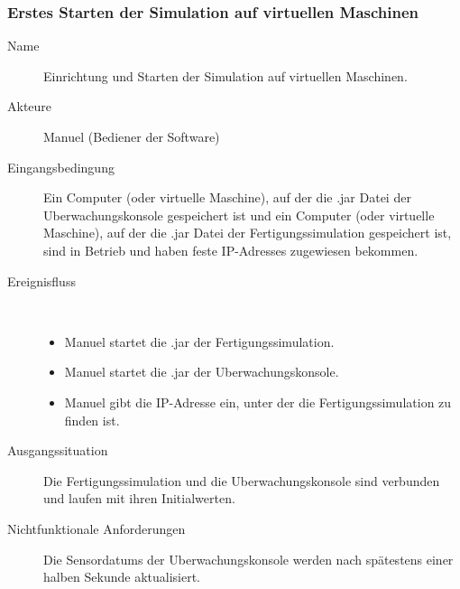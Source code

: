 \documentclass[parskip=full]{scrartcl}
\begin{document}
\subsubsection{Erstes Starten der Simulation auf virtuellen Maschinen}
\begin{description}
  \item[Name] Einrichtung und Starten der Simulation auf virtuellen Maschinen.
  \item[Akteure] Manuel (Bediener der Software)
  \item[Eingangsbedingung] Ein Computer (oder virtuelle Maschine), auf der die .jar Datei der \gls{Uberwachungskonsole} gespeichert ist und ein Computer (oder virtuelle Maschine), auf der die .jar
    Datei der \gls{Fertigungssimulation} gespeichert ist, sind in Betrieb und haben feste \glspl{IP-Adresse} zugewiesen bekommen.
  \item[Ereignisfluss]~\\
  \begin{itemize}[noitemsep]
    \item Manuel startet die .jar der \gls{Fertigungssimulation}.
    \item Manuel startet die .jar der \gls{Uberwachungskonsole}.
    \item Manuel gibt die \gls{IP-Adresse} ein, unter der die \gls{Fertigungssimulation} zu finden ist.
  \end{itemize}
  \item[Ausgangssituation] Die \gls{Fertigungssimulation} und die \gls{Uberwachungskonsole} sind verbunden und laufen mit ihren Initialwerten.
  \item[Nichtfunktionale Anforderungen] Die \glspl{Sensordatum} der \gls{Uberwachungskonsole} werden nach spätestens einer halben Sekunde aktualisiert.
\end{description}
\end{document}
